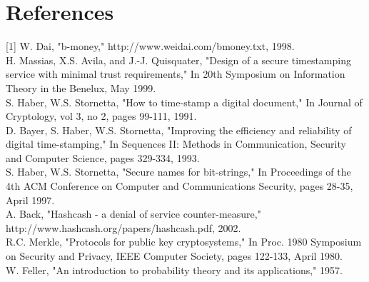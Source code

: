 \documentclass[11pt,a4paper]{article}
\begin{document}
\section{References}
[1] W. Dai, "b-money," http://www.weidai.com/bmoney.txt, 1998.\\
[2] H. Massias, X.S. Avila, and J.-J. Quisquater, "Design of a secure timestamping service with minimal trust requirements," In 20th Symposium on Information Theory in the Benelux, May 1999.\\
[3] S. Haber, W.S. Stornetta, "How to time-stamp a digital document," In Journal of Cryptology, vol 3, no 2, pages 99-111, 1991.\\
[4] D. Bayer, S. Haber, W.S. Stornetta, "Improving the efficiency and reliability of digital time-stamping," In Sequences II: Methods in Communication, Security and Computer Science, pages 329-334, 1993.\\
[5] S. Haber, W.S. Stornetta, "Secure names for bit-strings," In Proceedings of the 4th ACM Conference on Computer and Communications Security, pages 28-35, April 1997.\\
[6] A. Back, "Hashcash - a denial of service counter-measure," http://www.hashcash.org/papers/hashcash.pdf, 2002.\\
[7] R.C. Merkle, "Protocols for public key cryptosystems," In Proc. 1980 Symposium on Security and Privacy, IEEE Computer Society, pages 122-133, April 1980.\\
[8] W. Feller, "An introduction to probability theory and its applications," 1957.
\end{document}
